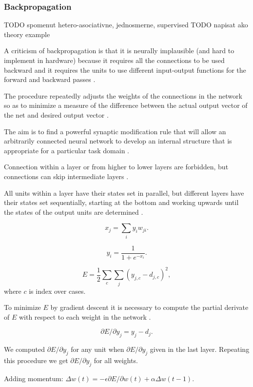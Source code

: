 \subsubsection{Backpropagation}

TODO spomenut hetero-asociativne, jednosmerne, supervised 
TODO napisat ako theory example

A criticism of backpropagation is that it is neurally implausible (and hard to implement in hardware) because it requires all the connections to be used backward and it requires the units to use different input-output functions for the forward and backward passes \citet{hinton1988learning}.

The procedure repeatedly adjusts the weights of the connections in the network so as to minimize a measure of the difference between the actual output vector of the net and desired output vector \citet{rumelhart1986learning}. 

The aim is to find a powerful synaptic modification rule that will allow an arbitrarily connected neural network to develop an internal structure that is appropriate for a particular task domain \citet{rumelhart1986learning}. 

Connection within a layer or from higher to lower layers are forbidden, but connections can skip intermediate layers \citet{rumelhart1986learning}.

All units within a layer have their states set in parallel, but different layers have their states set sequentially, starting at the bottom and working upwards until the states of the output units are determined \citet{rumelhart1986learning}. 

$$x_j = \sum_i y_iw_{ji}.$$

$$y_i = \frac{1}{1 + e^{-x_i}}.$$

$$E = \frac{1}{2} \sum_c \sum_j (y_{j,c} - d_{j,c})^2,$$
where $c$ is index over cases. 

To minimize $E$ by gradient descent it is necessary to compute the partial derivate of $E$ with respect to each weight in the network \citet{rumelhart1986learning}. 

$$\partial E / \partial y_j = y_j - d_j.$$

We computed $\partial E / \partial y_j$ for any unit when $\partial E / \partial y_j$ given in the last layer. Repeating this procedure we get $\partial E / \partial y_j$ for all weights. 

Adding momentum:
$\Delta w(t) = -\epsilon \partial E/ \partial w(t) + \alpha \Delta w(t-1).$

